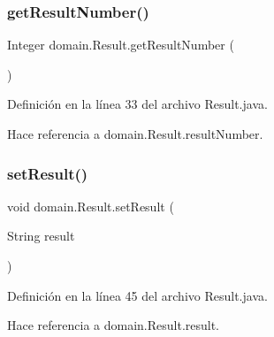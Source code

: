 \subsubsection{\texorpdfstring{getResultNumber()}{getResultNumber()}}
{\footnotesize\ttfamily Integer domain.\+Result.\+get\+Result\+Number (\begin{DoxyParamCaption}{ }\end{DoxyParamCaption})}



Definición en la línea 33 del archivo Result.\+java.


\begin{DoxyCode}{0}

\end{DoxyCode}


Hace referencia a domain.\+Result.\+result\+Number.

\mbox{\label{classdomain_1_1Result_a5648afcb541d207b61a7202609a41a27}} 
\subsubsection{\texorpdfstring{setResult()}{setResult()}}
{\footnotesize\ttfamily void domain.\+Result.\+set\+Result (\begin{DoxyParamCaption}\item[{String}]{result }\end{DoxyParamCaption})}



Definición en la línea 45 del archivo Result.\+java.


\begin{DoxyCode}{0}

\end{DoxyCode}


Hace referencia a domain.\+Result.\+result.


